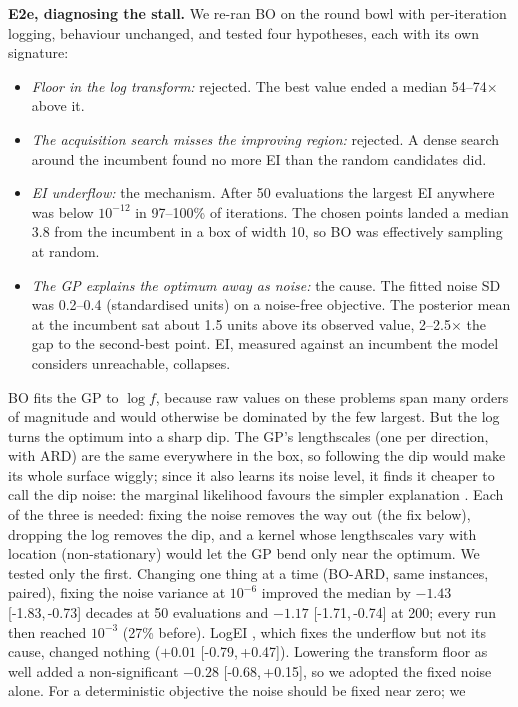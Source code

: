 \documentclass[10pt,a4paper]{article}
\newcommand{\ci}[2]{[#1,\,#2]}      %
\begin{document}
\textbf{E2e, diagnosing the stall.} We re-ran BO on the round bowl with per-iteration logging, behaviour
unchanged, and tested four hypotheses, each with its own signature:
\begin{itemize}
\item \emph{Floor in the log transform:} rejected. The best value ended a median 54--74$\times$ above it.
\item \emph{The acquisition search misses the improving region:} rejected. A dense search around the
incumbent found no more EI than the random candidates did.
\item \emph{EI underflow:} the mechanism. After 50 evaluations the largest EI anywhere was below
$10^{-12}$ in 97--100\% of iterations. The chosen points landed a median 3.8 from the incumbent in a box
of width 10, so BO was effectively sampling at random.
\item \emph{The GP explains the optimum away as noise:} the cause. The fitted noise SD was 0.2--0.4
(standardised units) on a noise-free objective. The posterior mean at the incumbent sat about 1.5 units
above its observed value, 2--2.5$\times$ the gap to the second-best point. EI, measured against an
incumbent the model considers unreachable, collapses.
\end{itemize}
BO fits the GP to $\log f$, because raw values on these problems span many orders of magnitude and would
otherwise be dominated by the few largest. But the log turns the optimum into a sharp dip. The GP's
lengthscales (one per direction, with ARD) are the same everywhere in the box, so following the dip would make
its whole surface wiggly; since it also learns its noise level, it finds it cheaper to call the dip noise: the marginal likelihood
favours the simpler explanation \citep[Ch.~5]{rasmussen2006gpml}.
Each of the three is needed: fixing the noise removes the way out (the fix below), dropping the log removes the
dip, and a kernel whose lengthscales vary with location (non-stationary) would let the GP bend only near the
optimum. We tested only the first.
Changing one thing at a time (BO-ARD, same instances, paired), fixing the noise variance at $10^{-6}$
improved the median by $-1.43$ \ci{-1.83}{-0.73} decades at 50 evaluations and $-1.17$ \ci{-1.71}{-0.74}
at 200; every run then reached $10^{-3}$ (27\% before). LogEI \citep{ament2023logei}, which fixes the
underflow but not its cause, changed nothing ($+0.01$ \ci{-0.79}{+0.47}). Lowering the transform floor as
well added a non-significant $-0.28$ \ci{-0.68}{+0.15}, so we adopted the fixed noise alone. For a deterministic objective the noise should be fixed near zero; we
\end{document}
